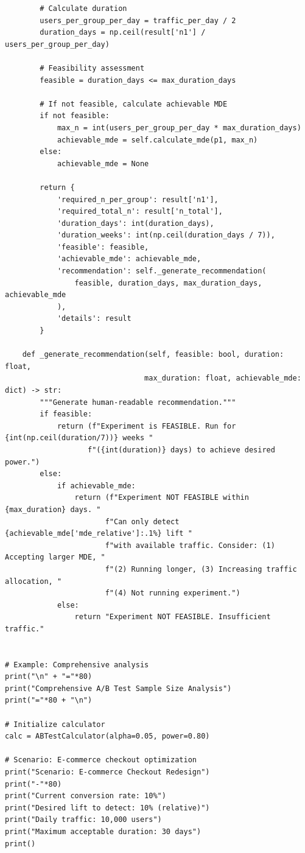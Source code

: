 \begin{lstlisting}
        # Calculate duration
        users_per_group_per_day = traffic_per_day / 2
        duration_days = np.ceil(result['n1'] / users_per_group_per_day)

        # Feasibility assessment
        feasible = duration_days <= max_duration_days

        # If not feasible, calculate achievable MDE
        if not feasible:
            max_n = int(users_per_group_per_day * max_duration_days)
            achievable_mde = self.calculate_mde(p1, max_n)
        else:
            achievable_mde = None

        return {
            'required_n_per_group': result['n1'],
            'required_total_n': result['n_total'],
            'duration_days': int(duration_days),
            'duration_weeks': int(np.ceil(duration_days / 7)),
            'feasible': feasible,
            'achievable_mde': achievable_mde,
            'recommendation': self._generate_recommendation(
                feasible, duration_days, max_duration_days, achievable_mde
            ),
            'details': result
        }

    def _generate_recommendation(self, feasible: bool, duration: float,
                                max_duration: float, achievable_mde: dict) -> str:
        """Generate human-readable recommendation."""
        if feasible:
            return (f"Experiment is FEASIBLE. Run for {int(np.ceil(duration/7))} weeks "
                   f"({int(duration)} days) to achieve desired power.")
        else:
            if achievable_mde:
                return (f"Experiment NOT FEASIBLE within {max_duration} days. "
                       f"Can only detect {achievable_mde['mde_relative']:.1%} lift "
                       f"with available traffic. Consider: (1) Accepting larger MDE, "
                       f"(2) Running longer, (3) Increasing traffic allocation, "
                       f"(4) Not running experiment.")
            else:
                return "Experiment NOT FEASIBLE. Insufficient traffic."


# Example: Comprehensive analysis
print("\n" + "="*80)
print("Comprehensive A/B Test Sample Size Analysis")
print("="*80 + "\n")

# Initialize calculator
calc = ABTestCalculator(alpha=0.05, power=0.80)

# Scenario: E-commerce checkout optimization
print("Scenario: E-commerce Checkout Redesign")
print("-"*80)
print("Current conversion rate: 10%")
print("Desired lift to detect: 10% (relative)")
print("Daily traffic: 10,000 users")
print("Maximum acceptable duration: 30 days")
print()


\end{lstlisting}
